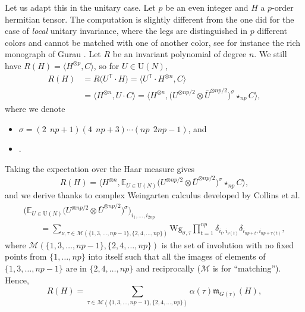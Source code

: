 \documentclass[pdftex]{sigma}
\numberwithin{equation}{section}
\theoremstyle{definition}
\begin{document}
Let us adapt this in the unitary case. Let $p$ be an even integer and $H$ a $p$-order hermitian tensor. The computation is slightly different from the one did for the case of {\em local} unitary invariance, where the legs are distinguished in $p$ different colors and cannot be matched with one of another color, see for instance the rich monograph of Gurau \cite{guraubook}. Let $R$ be an invariant polynomial of degree $n$. We still have $R(H) = \big\langle H^{\otimes p}, C \big\rangle$, so for $U \in \mathrm{U}(N)$,
\begin{align*}
R(H) & = R\bigl(U^{\mathsf T} \cdot H\bigr)= \big\langle U^{\mathsf T} \cdot H^{\otimes n}, C \big\rangle\\
& = \big\langle H^{\otimes n}, U \cdot C \big\rangle = \big\langle H^{\otimes n}, \bigl(U^{\otimes np/2} \otimes \bar U^{\otimes np/2}\bigr)^{\sigma} \star_{np} C \big\rangle,
\end{align*}
where we denote
\begin{itemize}\itemsep=0pt
    \item $\sigma = (2 \ \ np+1)(4 \ \ np+3)\cdots (np \ \ 2np-1)$, and
    \item {}.
\end{itemize}
Taking the expectation over the Haar measure gives
\[ R(H) = \big\langle H^{\otimes n}, \mathbb{E}_{U \in \mathrm{U}(N)} \bigl(U^{\otimes np/2} \otimes \bar U^{\otimes np/2}\bigr)^{\sigma} \star_{np} C \big\rangle, \]
and we derive thanks to complex Weingarten calculus developed by Collins et al.\ \cite{collinssniady04}
\begin{gather*}
 \bigl(\mathbb{E}_{U \in \mathrm{U}(N)} \bigl(U^{\otimes np/2} \otimes \bar U^{\otimes np/2}\bigr)^{\sigma}\bigr)_{i_1,\dots,i_{2np}}\\
  \qquad= \sum_{\nu, \tau \in \mathcal{M}(\{1,3,\dots,np-1\}, \{2,4,\dots,np\})} \mathrm{Wg}_{\sigma,\tau} \prod_{t=1}^{np} \delta_{i_t,i_{\nu(t)}} \delta_{i_{np+t},i_{np+\tau(t)}},
  \end{gather*}
where $\mathcal{M}(\{1,3,\dots,np-1\}, \{2,4,\dots,np\})$ is the set of involution with no fixed points from $\{1,\dots,np\}$ into itself such that all the images of elements of $\{1,3,\dots,np-1\}$ are in $\{2,4,\dots,np\}$ and reciprocally ($\mathcal{M}$ is for ``matching''). Hence,
\[R(H) = \sum_{\tau \in \mathcal{M}(\{1,3,\dots,np-1\}, \{2,4,\dots,np\})} \alpha(\tau) \mathfrak{m}_{G(\tau)}(H), \]
\end{document}
